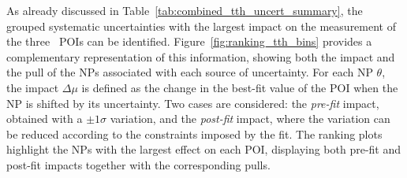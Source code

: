 As already discussed in Table~\ref{tab:combined_tth_uncert_summary}, the grouped systematic uncertainties with the largest impact on the measurement of the three \ttH\ POIs can be identified. 
Figure~\ref{fig:ranking_tth_bins} provides a complementary representation of this information, showing both the impact and the pull of the NPs associated with each source of uncertainty. 
For each NP $\theta$, the impact $\Delta\mu$ is defined as the change in the best-fit value of the POI when the NP is shifted by its uncertainty. 
Two cases are considered: the \textit{pre-fit} impact, obtained with a $\pm 1\sigma$ variation, and the \textit{post-fit} impact, where the variation can be reduced according to the constraints imposed by the fit. 
The ranking plots highlight the NPs with the largest effect on each POI, displaying both pre-fit and post-fit impacts together with the corresponding pulls.
